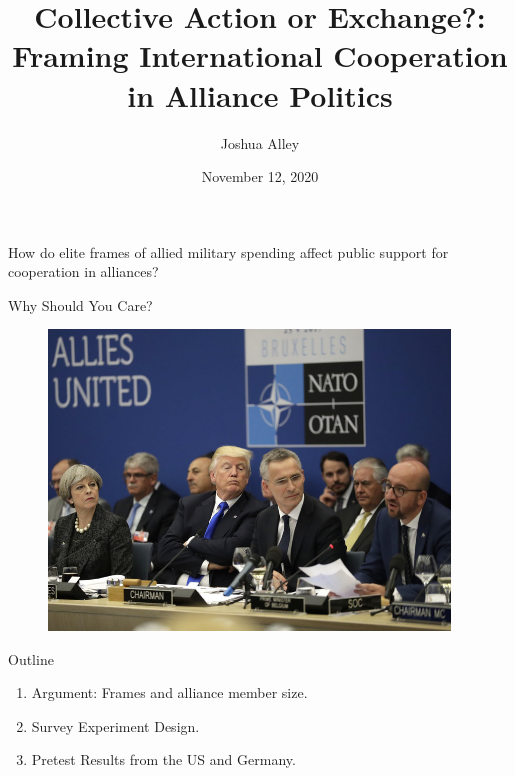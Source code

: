 \documentclass[12pt]{beamer}
\title{Collective Action or Exchange?: Framing International Cooperation in Alliance Politics}
\date{November 12, 2020}
\author{Joshua Alley}
\institute{University of Virginia}
\begin{document}
 \maketitle



 \begin{frame}[standout]

How do elite frames of allied military spending affect public support for cooperation in alliances? 

 \end{frame}
 


\begin{frame}{Why Should You Care?}

\begin{figure}[htbp]
		\includegraphics[width=0.95\textwidth]{trump-nato.jpg}
	\label{fig:trump-nato}
\end{figure}


\end{frame}



\begin{frame}{Outline}

\pause
\begin{enumerate}
\item Argument: Frames and alliance member size. 
\pause
\item Survey Experiment Design. 
\pause
\item Pretest Results from the US and Germany.  
\end{enumerate}


\end{frame}
 
\end{document}
